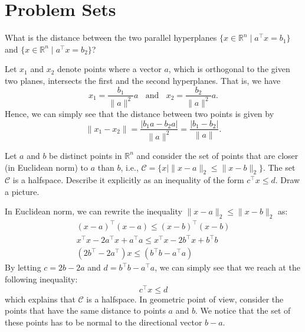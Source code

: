 \documentclass{llncs}
\newcommand{\pn}[1]{\left(#1\right)}
\begin{document}
\section*{Problem Sets}
\begin{problem}
What is the distance between the two parallel hyperplanes $\{x \in \mathbb{R}^n \mid a^\top x = b_1\}$ and $\{ x \in \mathbb{R}^n \mid a^\top x = b_2\}$?
\end{problem}
\begin{solution}
Let $x_1$ and $x_2$ denote points where a vector $a$, which is orthogonal to the given two planes, intersects the first and the second hyperplanes. That is, we have
\[
    x_1 = \frac{b_1}{\|a\|^2}a ~~~~\text{and}~~~~ x_2 = \frac{b_2}{\|a\|^2}a.
\] 
Hence, we can simply see that the distance between two points is given by 
\[
    \|x_1 - x_2\| =  \frac{|b_1a - b_2a|}{\|a\|^2} = \frac{|b_1 - b_2|}{\|a\|}. 
\]
\end{solution}

\begin{problem}
Let $a$ and $b$ be distinct points in $\mathbb{R}^n$ and consider the set of points that are closer (in Euclidean norm) to $a$ than $b$, i.e., $\mathcal{C} = \{ x \mid \|x - a \|_2 \le \| x - b \|_2 \}$. The set $\mathcal{C}$ is a halfspace. Describe it explicitly as an inequality of the form $c^\top x \le d$. Draw a picture.
\end{problem}
\begin{solution}
In Euclidean norm, we can rewrite the inequality $\|x-a\|_2 \le \|x - b\|_2$ as:
\begin{align*}
    \pn{x - a}^\top \pn{x - a} \le \pn{x - b}^\top \pn{x - b} \\
    x^\top x - 2a^\top x + a^\top a \le x^\top x - 2b^\top x + b^\top b \\
    \pn{2b^\top - 2a^\top} x  \le \pn{b^\top b - a^\top a} 
\end{align*}
By letting $c = 2b - 2a$ and $d = b^\top b - a^\top a$, we can simply see that we reach at the following inequality:
\[
    c^\top x \le d
\]
which explains that $\mathcal{C}$ is a halfspace. In geometric point of view, consider the points that have the same distance to points $a$ and $b$. We notice that the set of these points has to be normal to the directional vector $b - a$. 
\end{solution}
\end{document}
